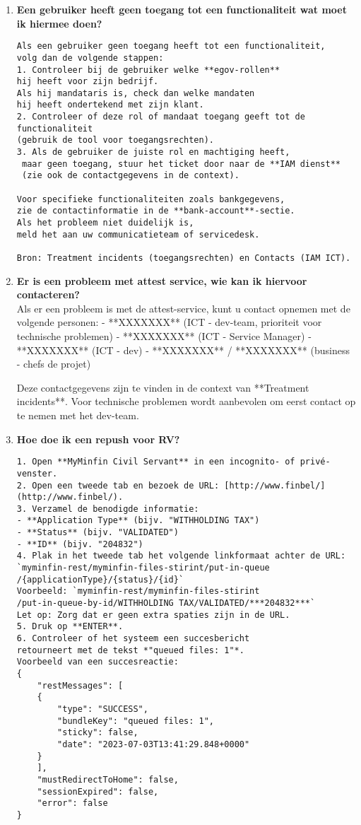 \begin{enumerate}
    \item \textbf{Een gebruiker heeft geen toegang tot een functionaliteit wat moet ik hiermee doen?}
\begin{verbatim}
Als een gebruiker geen toegang heeft tot een functionaliteit, 
volg dan de volgende stappen:  
1. Controleer bij de gebruiker welke **egov-rollen** 
hij heeft voor zijn bedrijf. 
Als hij mandataris is, check dan welke mandaten
hij heeft ondertekend met zijn klant.  
2. Controleer of deze rol of mandaat toegang geeft tot de functionaliteit 
(gebruik de tool voor toegangsrechten).  
3. Als de gebruiker de juiste rol en machtiging heeft,
 maar geen toegang, stuur het ticket door naar de **IAM dienst** 
 (zie ook de contactgegevens in de context).  

Voor specifieke functionaliteiten zoals bankgegevens, 
zie de contactinformatie in de **bank-account**-sectie. 
Als het probleem niet duidelijk is, 
meld het aan uw communicatieteam of servicedesk.  

Bron: Treatment incidents (toegangsrechten) en Contacts (IAM ICT).
\end{verbatim}
    \item \textbf{Er is een probleem met attest service, wie kan ik hiervoor contacteren?} \\
    Als er een probleem is met de attest-service, kunt u contact opnemen met de volgende personen:  
    - **XXXXXXX** (ICT - dev-team, prioriteit voor technische problemen)  
    - **XXXXXXX** (ICT - Service Manager)  
    - **XXXXXXX** (ICT - dev)  
    - **XXXXXXX** / **XXXXXXX** (business - chefs de projet)  
    
    Deze contactgegevens zijn te vinden in de context van **Treatment incidents**. Voor technische problemen wordt aanbevolen om eerst contact op te nemen met het dev-team.
    
    
    \item \textbf{Hoe doe ik een repush voor RV?} \\
\begin{verbatim}
1. Open **MyMinfin Civil Servant** in een incognito- of privé-venster.  
2. Open een tweede tab en bezoek de URL: [http://www.finbel/]
(http://www.finbel/).  
3. Verzamel de benodigde informatie:  
- **Application Type** (bijv. "WITHHOLDING TAX")  
- **Status** (bijv. "VALIDATED")  
- **ID** (bijv. "204832")  
4. Plak in het tweede tab het volgende linkformaat achter de URL:  
`myminfin-rest/myminfin-files-stirint/put-in-queue
/{applicationType}/{status}/{id}`  
Voorbeeld: `myminfin-rest/myminfin-files-stirint
/put-in-queue-by-id/WITHHOLDING TAX/VALIDATED/***204832***`  
Let op: Zorg dat er geen extra spaties zijn in de URL.  
5. Druk op **ENTER**.  
6. Controleer of het systeem een succesbericht 
retourneert met de tekst *"queued files: 1"*.  
Voorbeeld van een succesreactie:  
{
    "restMessages": [
    {
        "type": "SUCCESS",
        "bundleKey": "queued files: 1",
        "sticky": false,
        "date": "2023-07-03T13:41:29.848+0000"
    }
    ],
    "mustRedirectToHome": false,
    "sessionExpired": false,
    "error": false
}
\end{verbatim}


\end{enumerate}
